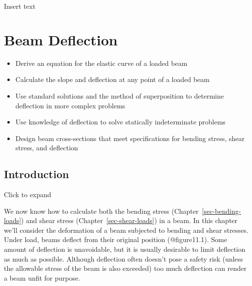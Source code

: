\documentclass[
  letterpaper,
  DIV=11,
  numbers=noendperiod]{scrreprt}
\providecommand{\tightlist}{%
  \setlength{\itemsep}{0pt}\setlength{\parskip}{0pt}}\usepackage{longtable,booktabs,array}
\begin{document}
Insert text


\chapter{Beam Deflection}\label{sec-beam-deflection}

\begin{tcolorbox}[enhanced jigsaw, colback=white, colframe=quarto-callout-note-color-frame, leftrule=.75mm, opacitybacktitle=0.6, colbacktitle=quarto-callout-note-color!10!white, arc=.35mm, bottomrule=.15mm, breakable, title={Learning Objectives}, left=2mm, titlerule=0mm, toptitle=1mm, toprule=.15mm, opacityback=0, rightrule=.15mm, coltitle=black, bottomtitle=1mm]

\begin{itemize}
\tightlist
\item
  Derive an equation for the elastic curve of a loaded beam
\item
  Calculate the slope and deflection at any point of a loaded beam
\item
  Use standard solutions and the method of superposition to determine
  deflection in more complex problems
\item
  Use knowledge of deflection to solve statically indeterminate problems
\item
  Design beam cross-sections that meet specifications for bending
  stress, shear stress, and deflection
\end{itemize}

\end{tcolorbox}

\section*{Introduction}\label{introduction-11}


Click to expand

We now know how to calculate both the bending stress
(Chapter~\ref{sec-bending-loads}) and shear stress
(Chapter~\ref{sec-shear-loads}) in a beam. In this chapter we'll
consider the deformation of a beam subjected to bending and shear
stresses. Under load, beams deflect from their original position
(@figure11.1). Some amount of deflection is unavoidable, but it is
usually desirable to limit deflection as much as possible. Although
deflection often doesn't pose a safety risk (unless the allowable stress
of the beam is also exceeded) too much deflection can render a beam
unfit for purpose.
\end{document}
